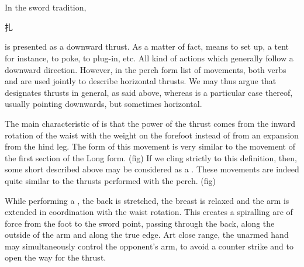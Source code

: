 \section{\Zha}
In the \Yangjia{} \Michuan{} sword tradition, \Zha{} \begin{CJK*}{UTF8}{bsmi}扎\end{CJK*} is presented as a downward thrust. As a matter of fact, \Zha{} means to set up, a tent for instance, to poke, to plug-in, etc. All kind of actions which generally follow a downward direction. However, in the \Yangjia{} \Michuan{} perch form list of movements, both verbs \Zha{} and \Ci{} are used jointly to describe horizontal thrusts. We may thus argue that \Ci{} designates thrusts in general,  as said above,  whereas \Zha{} is a particular case thereof,   usually pointing downwards, but sometimes horizontal. 

The main characteristic of \Zha{} is that the power of the thrust comes from the inward rotation of the waist with the weight on the forefoot instead of from an expansion from the hind leg.   The form of this movement is very similar to the \Tuishou{} movement of the first section of the Long form. (fig)
If we cling strictly to this definition, then, some short \Ci{} described above may be considered as a \Zha{}. These movements are indeed quite similar to the thrusts performed with the perch. (fig)

While performing a \Zha{}, the back is stretched, the breast is relaxed and the arm is extended in coordination with the waist rotation. This creates a spiralling arc of force from the foot to the sword point, passing through the back, along the outside of the arm and along the true edge. Art close range,  the unarmed hand may simultaneously control the opponent's arm, to avoid a counter strike and to open the way for the thrust.

